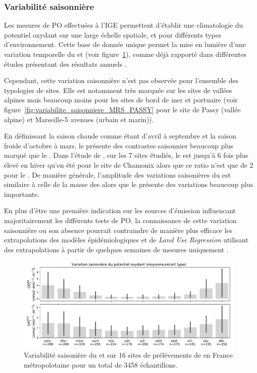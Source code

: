 \subsubsection{Variabilité saisonnière}%
\label{ssub:variabilité_saisonnière}

Les mesures de PO effectuées à l'IGE permettent d'établir une climatologie du potentiel
oxydant sur une large échelle spatiale, et pour différents types d'environnement. Cette
base de donnée unique permet la mise en lumière d'une variation temporelle du \POAAv{} et
\PODTTv{} (voir figure~\ref{fig:variabilite_saisonniere}), comme déjà rapporté dans
différentes études présentant des résultats annuels
\autocite{fangOxidative2016,calasComparison2018,calasSeasonal2019,pietrograndePM102018}.

Cependant, cette variation saisonnière n'est pas observée pour l'ensemble des typologies
de sites. Elle est notamment très marquée sur les sites de vallées alpines mais beaucoup
moins pour les sites de bord de mer et portuaire (voir
figure~\ref{fig:variabilite_saisonniere_MRS_PASSY} pour le site de Passy (vallée alpine)
et Marseille-5 avenues (urbain et marin)).

En définissant la saison chaude comme étant d'avril à septembre et la saison froide
d'octobre à mars, le \POAAv{} présente des contrastes saisonnier beaucoup plus marqué que
le \PODTTv. Dans l'étude de \cite[tableau 3]{calasSeasonal2019}, sur les 7 sites étudiés,
le \POAAv{} est jusqu'à 6 fois plus élevé en hiver qu'en été pour le site de Chamonix
alors que ce ratio n'est que de 2 pour le \PODTTv. De manière générale, l'amplitude des
variations saisonières du \PODTTv{} est similaire à celle de la masse des \PMdix{} alors
que le \POAAv{} présente des variations beaucoup plus importante.

En plus d'être une première indication sur les sources d'émission influencant
majoritairement les différents tests de PO, la connaissance de cette variation saisonnière
ou son absence pourrait contraindre de manière plus efficace les extrapolations des
modèles épidémiologiques et de \textit{Land Use Regression} utilisant des extrapolations à
partir de quelques semaines de mesures uniquement
\autocite{yangaileenSpatial2015,jedynskaSpatial2017}.

\begin{figure}[ht]
    \centering
    \includegraphics[width=1.0\linewidth]{figures/chapter04/variabilite_saisonniere.pdf}
    \caption{Variabilité saisonière du \POAAv{} et \PODTTv{} sur 16 sites de prélévements
        de \PMdix{} en France métropolotaine pour un total de 3458 échantillons.
    }%
    \label{fig:variabilite_saisonniere}
\end{figure}


